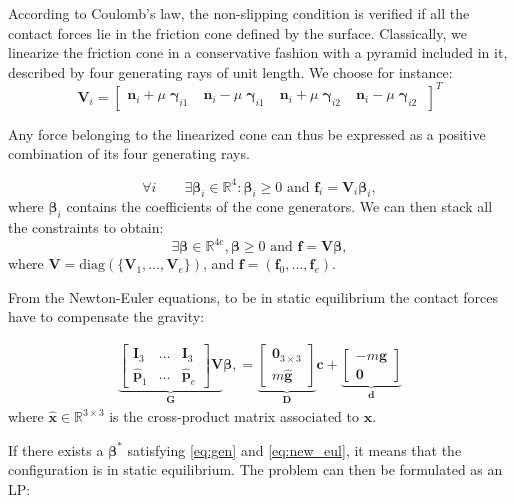 \documentclass[journal]{IEEEtran}
\newcommand{\mat}[1]{\ensuremath{\begin{bmatrix}#1\end{bmatrix}}}	%
\newcommand{\diag}[1]{\text{diag}(#1)}							%
\newcommand{\R}[2]{\ensuremath{\mathbb{R}^{#1\times #2}}}		%
\begin{document}
According to Coulomb's law, the non-slipping condition is verified if all the contact forces lie in the friction cone defined by the surface.
Classically, we linearize the friction cone in a conservative fashion with a pyramid included in it, described by four generating rays of unit length. We choose for instance:
\begin{equation*}
\mathbf{V}_{i} = \mat{\mathbf{n}_{i} + \mu \mathbf{\boldsymbol\upgamma}_{i1} & \mathbf{n}_{i} -\mu \mathbf{\boldsymbol\upgamma}_{i1} & \mathbf{n}_{i} + \mu \mathbf{\boldsymbol\upgamma}_{i2} & \mathbf{n}_{i} - \mu \mathbf{\boldsymbol\upgamma}_{i2}}^T
\end{equation*}

Any force belonging to the linearized cone
can thus be expressed as a positive combination of its four generating rays.

\begin{equation*}
\forall i  \qquad  \exists \bm{\beta}_i \in \mathbb{R}^{4} : \bm{\beta}_i \ge 0 \text{ and } \mathbf{f}_{i} = \mathbf{V}_{i} \bm{\beta}_i,
\end{equation*}
where $\bm{\beta}_i$ contains the coefficients of the cone generators.
We can then stack all the constraints to obtain:
\begin{equation}\label{eq:gen}
\exists \bm{\beta} \in \mathbb{R}^{4e} ,  \bm{\beta} \ge 0 \text{ and } \mathbf{f} = \mathbf{V} \bm{\beta},
\end{equation}
where $\mathbf{V} = \diag{ \{\mathbf{V}_1, \dots, \mathbf{V}_e\} }$, and $\mathbf{f} = (\mathbf{f}_0,...,\mathbf{f}_e)$.

From the Newton-Euler equations, to be in static equilibrium the contact forces have to compensate the gravity:


\begin{align} \label{eq:new_eul}
\underbrace{
\mat{\mathbf{I}_3 & \dots & \mathbf{I}_3 \\
\hat{\mathbf{p}}_1 & \dots & \hat{\mathbf{p}}_e} \mathbf{V}
}_\mathbf{G} \bm{\beta}, = 
\underbrace{\mat{\mathbf{0}_{3\times 3} \\ m \hat{\mathbf{g}}}}_{\mathbf{D}} \mathbf{c} + 
\underbrace{\mat{-m\mathbf{g} \\ \mathbf{0}}}_{\mathbf{d}}
\end{align}
where $\hat{\mathbf{x}} \in \R{3}{3}$ is the cross-product matrix associated to $\mathbf{x}$.


If there exists a $\bm{\beta}^*$ satisfying \eqref{eq:gen} and \eqref{eq:new_eul}, it means that the configuration is in static equilibrium.
The problem can then be formulated as an LP:
\end{document}
